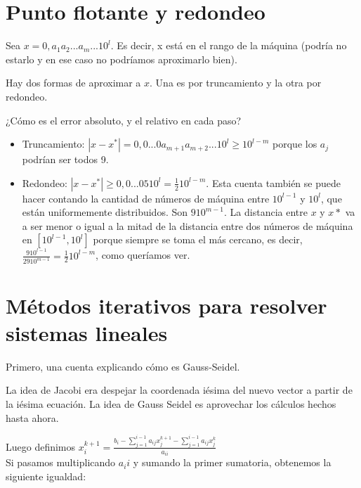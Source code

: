 \documentclass[10pt,a4paper,final]{report}
\begin{document}
\newtheorem{theorem}{Teorema}
\newtheorem{proof}{Proof}
\newtheorem{lemma}{Lema}
\newtheorem{definition}{Definición}
\newtheorem{proposition}{Proposition}
\newtheorem{observation}{Observation}
\newtheorem{corollary}{Corollary}
\newtheorem{example}{Examples}

\section{Punto flotante y redondeo}
{
	Sea $x=0,a_1 a_2...a_m... 10^l$. Es decir, x está en el rango de la máquina (podría no estarlo y en ese caso no podríamos aproximarlo bien).
	
Hay dos formas de aproximar a $x$. Una es por truncamiento y la otra por redondeo.

¿Cómo es el error absoluto, y el relativo en cada paso?

\begin{itemize}
	\item Truncamiento: $|x-x^*| = 0,0...0a_{m+1}a_{m+2}... 10^l \geq 10^{l-m}$ porque los $a_j$ podrían ser todos 9.
	\item Redondeo: $|x-x^*| \geq 0,0...05 10^l = \frac{1}{2} 10^{l-m}$. Esta cuenta también se puede hacer contando la cantidad de números de máquina entre $10^{l-1}$ y $10^{l}$, que están uniformemente distribuidos. Son $9 10^{m-1}$. La distancia entre $x$ y $x*$ va a ser menor o igual a la mitad de la distancia entre dos números de máquina en $[10^{l-1}, 10^{l}]$ porque siempre se toma el más cercano, es decir, $\frac{9 10^{l-1}}{2 9 10^{m-1}} = \frac{1}{2} 10^{l-m}$, como queríamos ver.
\end{itemize}
}



\section{Métodos iterativos para resolver sistemas lineales}

Primero, una cuenta explicando cómo es Gauss-Seidel.

La idea de Jacobi era despejar la coordenada iésima del nuevo vector a partir de la iésima ecuación. La idea de Gauss Seidel es aprovechar los cálculos hechos hasta ahora.

Luego definimos $x_i^{k+1}=\frac{b_i - \sum_{j=1}^{i-1}a_{ij}x_j^{k+1}-\sum_{j=1}^{i-1}a_{ij}x_j^{k}}{a_{ii}}$\\

Si pasamos multiplicando $a_ii$ y sumando la primer sumatoria, obtenemos la siguiente igualdad:
\end{document}

